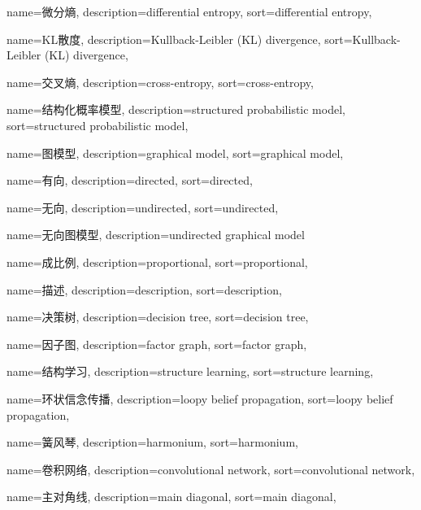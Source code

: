 {
  name=微分熵,
  description={differential entropy},
  sort={differential entropy},
}

{
  name=KL散度,
  description={Kullback-Leibler (KL) divergence},
  sort={Kullback-Leibler (KL) divergence},
}

{
  name=交叉熵,
  description={cross-entropy},
  sort={cross-entropy},
}

{
  name=结构化概率模型,
  description={structured probabilistic model},
  sort={structured probabilistic model},
}

{
  name=图模型,
  description={graphical model},
  sort={graphical model},
}

{
  name=有向,
  description={directed},
  sort={directed},
}

{
  name=无向,
  description={undirected},
  sort={undirected},
}

{
  name=无向图模型,
  description={undirected graphical model}
}

{
  name=成比例,
  description={proportional},
  sort={proportional},
}

{
  name=描述,
  description={description},
  sort={description},
}

{
  name=决策树,
  description={decision tree},
  sort={decision tree},
}

{
  name=因子图,
  description={factor graph},
  sort={factor graph},
}

{
  name=结构学习,
  description={structure learning},
  sort={structure learning},
}

{
  name=环状信念传播,
  description={loopy belief propagation},
  sort={loopy belief propagation},
}

{
  name=簧风琴,
  description={harmonium},
  sort={harmonium},
}

{
  name=卷积网络,
  description={convolutional network},
  sort={convolutional network},
}

{
  name=主对角线,
  description={main diagonal},
  sort={main diagonal},
}

